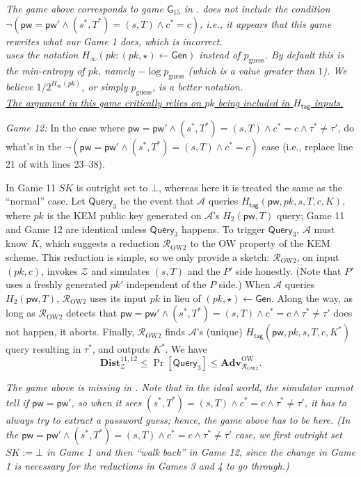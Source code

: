 \documentclass{article}
\theoremstyle{plain}
\theoremstyle{definition}
\theoremstyle{remark}
\newcommand{\adv}{\mathcal{A}}
\newcommand{\env}{\mathcal{Z}}
\newcommand{\red}{\mathcal{R}}
\newcommand{\Adv}{\mathbf{Adv}}
\newcommand{\Dist}{\mathbf{Dist}}
\newcommand{\Gen}{\mathsf{Gen}}
\newcommand{\Htag}{H_\mathsf{tag}}
\newcommand{\pw}{\mathsf{pw}}
\newcommand{\Query}{\mathsf{Query}}
\begin{document}
\emph{{\color{red}The game above corresponds to game $\mathsf{G}_{15}$ in \cite{EPRINT:ArrBarJar25}. \cite{EPRINT:ArrBarJar25} does not include the condition $\neg(\pw = \pw' \land (s^*,T^*) = (s,T) \land c^* = c)$, i.e., it appears that this game rewrites what our Game 1 does, which is incorrect. \\
\indent \cite{EPRINT:ArrBarJar25} uses the notation $H_\infty(pk : (pk,\star) \gets \Gen)$ instead of $p_\mathrm{guess}$. By default this is the min-entropy of $pk$, namely $-\log p_\mathrm{guess}$ (which is a value greater than $1$). We believe $1/2^{H_\infty(pk)}$, or simply $p_\mathrm{guess}$, is a better notation. \\
\indent\ul{The argument in this game critically relies on $pk$ being included in $\Htag$ inputs.}
}}

\medskip\noindent\emph{Game 12:} In the case where $\pw = \pw' \land (s^*,T^*) = (s,T) \land c^* = c \land \tau^* \neq \tau'$, do what's in the $\neg(\pw = \pw' \land (s^*,T^*) = (s,T) \land c^* = c)$ case (i.e., replace line 21 of  with lines 23--38).

In Game 11 $SK$ is outright set to $\bot$, whereas here it is treated the same as the ``normal'' case. Let $\mathsf{Query}_3$ be the event that $\adv$ queries $\Htag(\pw,pk,s,T,c,K)$, where $pk$ is the KEM public key generated on $\adv$'s $H_2(\pw,T)$ query; Game 11 and Game 12 are identical unless $\mathsf{Query}_3$ happens. To trigger $\mathsf{Query}_3$, $\adv$ must know $K$, which suggests a reduction $\red_\text{OW2}$ to the OW property of the KEM scheme. This reduction is simple, so we only provide a sketch: $\red_\text{OW2}$, on input $(pk,c)$, invokes $\env$ and simulates $(s,T)$ and the $P'$ side honestly. (Note that $P'$ uses a freshly generated $pk'$ independent of the $P$ side.) When $\adv$ queries $H_2(\pw,T)$, $\red_\text{OW2}$ uses its input $pk$ in lieu of $(pk,\star) \gets \Gen$. Along the way, as long as $\red_\text{OW2}$ detects that $\pw = \pw' \land (s^*,T^*) = (s,T) \land c^* = c \land \tau^* \neq \tau'$ does not happen, it aborts. Finally, $\red_\text{OW2}$ finds $\adv$'s (unique) $\Htag(\pw,pk,s,T,c,K^*)$ query resulting in $\tau^*$, and outputs $K^*$. We have
\[
\Dist_\env^{11,12} \leq \Pr[\Query_3] \leq \Adv_{\red_\text{OW2}}^\text{OW}.
\]

\emph{{\color{red}The game above is missing in \cite{EPRINT:ArrBarJar25}. Note that in the ideal world, the simulator cannot tell if $\pw = \pw'$, so when it sees $(s^*,T^*) = (s,T) \land c^* = c \land \tau^* \neq \tau'$, it has to always try to extract a password guess; hence, the game above has to be here. (In the $\pw = \pw' \land (s^*,T^*) = (s,T) \land c^* = c \land \tau^* \neq \tau'$ case, we first outright set $SK := \bot$ in Game 1 and then ``walk back'' in Game 12, since the change in Game 1 is necessary for the reductions in Games 3 and 4 to go through.)}}
\end{document}
